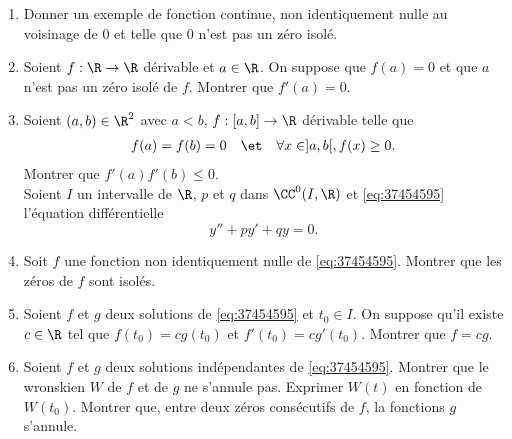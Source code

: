 \begin{enonce}
\begin{exercise}[ID={RMS 122 E267},subtitle={},tags={}, difficulty={0}]
\begin{enumerate}
  \item Donner un exemple de fonction continue, non identiquement nulle au voisinage de $0$ et telle que $0$ n'est pas un zéro isolé.

  \item Soient $f:\R\to\R$ dérivable et $a\in\R$.
	On suppose que $f(a)=0$ et que $a$ n'est pas un zéro isolé de $f$.
	Montrer que $f'(a)=0$.

  \item Soient $(a,b)\in\R^2$ avec $a<b$, $f:[a,b]\to\R$ dérivable telle que
	\begin{align*}
	  f(a)=f(b)&=0&
	  &\et&
	  \forall x\in]a,b[, f(x)\geq 0.
	\end{align*}
	Montrer que $f'(a) f'(b)\leq 0$.\\

	Soient $I$ un intervalle de $\R$, $p$ et $q$ dans $\CC^0(I,\R)$ et \eqref{eq:37454595} l'équation différentielle
	\begin{equation}
	  \tag{E} \label{eq:37454595}
	  y''+py'+qy=0.
	\end{equation}

  \item Soit $f$ une fonction non identiquement nulle de \eqref{eq:37454595}. Montrer que les zéros de $f$ sont isolés.

  \item Soient $f$ et $g$ deux solutions de \eqref{eq:37454595} et $t_0\in I$.
	On suppose qu'il existe $c\in\R$ tel que $f(t_0)=cg(t_0)$ et $f'(t_0)=cg'(t_0)$.
	Montrer que $f=cg$.

  \item Soient $f$ et $g$ deux solutions indépendantes de \eqref{eq:37454595}.
	Montrer que le wronskien $W$ de $f$ et de $g$ ne s'annule pas.
	Exprimer $W(t)$ en fonction de $W(t_0)$.
	Montrer que, entre deux zéros consécutifs de $f$, la fonctions $g$ s'annule.
\end{enumerate}
\end{exercise}
\begin{solution}
\end{solution}
\end{enonce}
